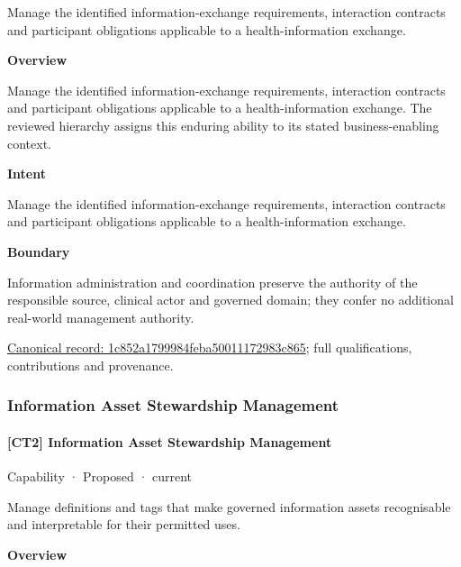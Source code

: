 Manage the identified information-exchange requirements, interaction contracts and participant obligations applicable to a health-information exchange.



\textbf{Overview}



Manage the identified information-exchange requirements, interaction contracts and participant obligations applicable to a health-information exchange. The reviewed hierarchy assigns this enduring ability to its stated business-enabling context.



\textbf{Intent}



Manage the identified information-exchange requirements, interaction contracts and participant obligations applicable to a health-information exchange.



\textbf{Boundary}



Information administration and coordination preserve the authority of the responsible source, clinical actor and governed domain; they confer no additional real-world management authority.


{\footnotesize \href{../../../../continuum/strategy/capability/1c852a1799984feba50011172983c865.md}{Canonical record: 1c852a1799984feba50011172983c865}; full qualifications, contributions and provenance.}\par
\subsubsection{Information Asset Stewardship Management}

\paragraph{[CT2] Information Asset Stewardship Management}

\label{element:5bac15316d8d4f4db6e7a253f1acfbe3}
{\small Capability · Proposed · current}\par

Manage definitions and tags that make governed information assets recognisable and interpretable for their permitted uses.



\textbf{Overview}



